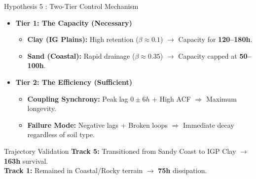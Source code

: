 \begin{frame}{Hypothesis 5 : Two-Tier Control Mechanism}
	\vspace{0.1cm}
	\footnotesize
	\begin{itemize}
		\item \textbf{Tier 1: The Capacity (Necessary)}
		      \begin{itemize} \footnotesize
			      \item \textbf{Clay (IG Plains):} High retention ($\beta \approx 0.1$) $\rightarrow$ Capacity for \textbf{120--180h}.
			      \item \textbf{Sand (Coastal):} Rapid drainage ($\beta \approx 0.35$) $\rightarrow$ Capacity capped at \textbf{50--100h}.
		      \end{itemize}
		\item \textbf{Tier 2: The Efficiency (Sufficient)}
		      \begin{itemize} \footnotesize
			      \item \textbf{Coupling Synchrony:} Peak lag $0 \pm 6h$ + High ACF $\Rightarrow$ Maximum longevity.
			      \item \textbf{Failure Mode:} Negative lags + Broken loops $\Rightarrow$ Immediate decay regardless of soil type.
		      \end{itemize}
	\end{itemize}

	\vspace{-0.1cm}
	\footnotesize
	\begin{exampleblock}{\footnotesize Trajectory Validation}
		\textbf{Track 5:} Transitioned from Sandy Coast to IGP Clay $\rightarrow$ \textbf{163h} survival.\\
		\textbf{Track 1:} Remained in Coastal/Rocky terrain $\rightarrow$ \textbf{75h} dissipation.
	\end{exampleblock}
\end{frame}

